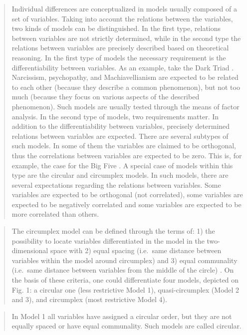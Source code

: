 \documentclass[
  authoryear,
  preprint,
  3p]{elsarticle}
\begin{document}
\begin{quote}
Individual differences are conceptualized in models usually composed of
a set of variables. Taking into account the relations between the
variables, two kinds of models can be distinguished. In the first type,
relations between variables are not strictly determined, while in the
second type the relations between variables are precisely described
based on theoretical reasoning. In the first type of models the
necessary requirement is the differentiability between variables. As an
example, take the Dark Triad \citep{Paulhus2002}. Narcissism,
psychopathy, and Machiavellianism are expected to be related to each
other (because they describe a common phenomenon), but not too much
(because they focus on various aspects of the described phenomenon).
Such models are usually tested through the means of factor analysis. In
the second type of models, two requirements matter. In addition to the
differentiability between variables, precisely determined relations
between variables are expected. There are several subtypes of such
models. In some of them the variables are claimed to be orthogonal, thus
the correlations between variables are expected to be zero. This is, for
example, the case for the Big Five \citep{Mccrae1997}. A special case of
models within this type are the circular and circumplex models. In such
models, there are several expectations regarding the relations between
variables. Some variables are expected to be orthogonal (not
correlated), some variables are expected to be negatively correlated and
some variables are expected to be more correlated than others.
\end{quote}

\begin{quote}
The circumplex model can be defined through the terms of: 1) the
possibility to locate variables differentiated in the model in the
two-dimensional space with 2) equal spacing (i.e.~same distance between
variables within the model around circumplex) and 3) equal communality
(i.e.~same distance between variables from the middle of the circle)
\citep[\citet{Pincus2003Interpersonal}]{Gurtman1994differentiating}. On
the basis of these criteria, one could differentiate four models,
depicted on Fig. 1: a circular one (less restrictive Model 1),
quasi-circumplex (Model 2 and 3), and circumplex (most restrictive Model
4).
\end{quote}

\begin{quote}
In Model 1 all variables have assigned a circular order, but they are
not equally spaced or have equal communality. Such models are called
circular.
\end{quote}
\end{document}
